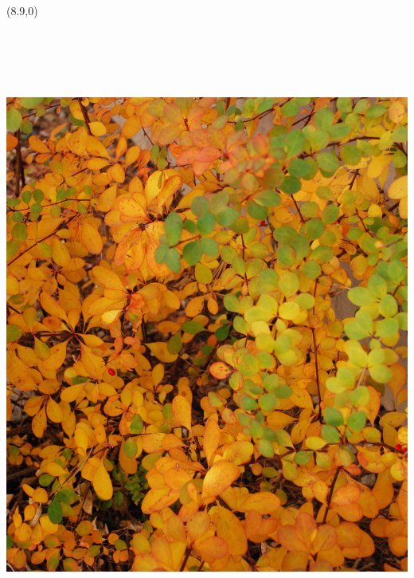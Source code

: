 \documentclass{article}
\begin{document}
{\begin{textblock}{6.125}(8.9,0)
\noindent\includegraphics[angle=90,height=8.25in,width=9.881in]{../../CoverImages/FrontMain.jpg}
\end{textblock}


}
\end{document}
